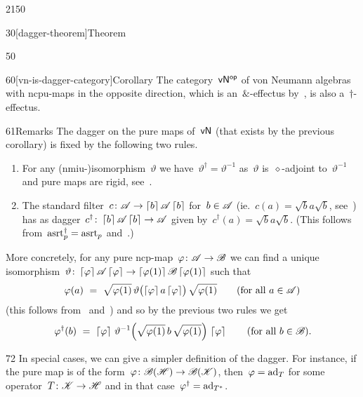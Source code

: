 \begin{parsec}{2150}
\begin{point}{30}[dagger-theorem]{Theorem}
\begin{point}{50}
\end{point}
\begin{point}{60}[vn-is-dagger-category]{Corollary}%
The category~${\mathsf{vN}}{^{\mathsf{op}}}$ of von Neumann algebras with
    ncpu-maps in the opposite direction,
    which is an~$\&$-effectus by~,
    is also a~$\dagger$-effectus.
\end{point}
\begin{point}{61}{Remarks}%
    The dagger on the pure maps of~$\mathsf{vN}$ (that exists by the previous
    corollary) is fixed by the following two rules.
\begin{enumerate}
\item
    For any (nmiu-)isomorphism~$\vartheta$
        we have~$\vartheta^\dagger = \vartheta^{-1}$
        as~$\vartheta$ is~$\diamond$-adjoint to~$\vartheta^{-1}$
         and pure maps are rigid, see~.
\item
    The standard filter~$c\colon \mathscr{A} \to \left\lceil b\right\rceil \mathscr{A} \left\lceil b\right\rceil$
        for~$b \in \mathscr{A}$
        (ie.~$c(a) = \sqrt{b}a\sqrt{b}$, see~)
        has as dagger~$c^\dagger\colon \left\lceil b\right\rceil \mathscr{A}  \left\lceil b\right\rceil \to \mathscr{A}$
        given by~$c^\dagger(a) = \sqrt{b} a \sqrt{b}$.
        (This follows from~$\mathrm{asrt}_p^\dagger = \mathrm{asrt}_p$
            and~.)
\end{enumerate}
More concretely,
    for any pure ncp-map~$\varphi\colon \mathscr{A} \to \mathscr{B}$
    we can find
    a unique isomorphism~$\vartheta \colon \left\lceil\varphi\right\rceil \mathscr{A} \left\lceil\varphi\right\rceil
    \to \left\lceil\varphi(1)\right\rceil \mathscr{B} \left\lceil\varphi(1)\right\rceil$
    such that
\begin{equation*}
    \varphi(a) \ =\  \sqrt{\varphi(1)} \,\vartheta
    \bigl(\left\lceil\varphi\right\rceil a \left\lceil\varphi\right\rceil\bigr) \,\sqrt{\varphi(1)} \qquad \text{(for all $a\in \mathscr{A}$)}
\end{equation*}
    (this follows from~ and~)
    and so by the previous two rules we get
\begin{equation*}
    \varphi^\dagger(b) \ = \  \left\lceil\varphi\right\rceil \,\vartheta^{-1} 
    \Bigl( \sqrt{\varphi(1)} \, b \, \sqrt{\varphi(1)} \Bigr) \, \left\lceil\varphi\right\rceil
        \qquad \text{(for all $b \in \mathscr{B}$)}.
\end{equation*}
\spacingfix{}
\begin{point}{72}%
In special cases, we can give a simpler definition of the dagger.
For instance, if the
    pure map is of the form~$\varphi\colon \mathscr{B}(\mathscr{H}) \to \mathscr{B}(\mathscr{K})$,
    then~$\varphi = \mathrm{ad}_T$ for some operator~$T \colon \mathscr{K} \to \mathscr{H}$
    and in that case~$\varphi^\dagger = \mathrm{ad}_{T^*}$.


\end{point}
\end{point}
\end{point}
\end{parsec}
